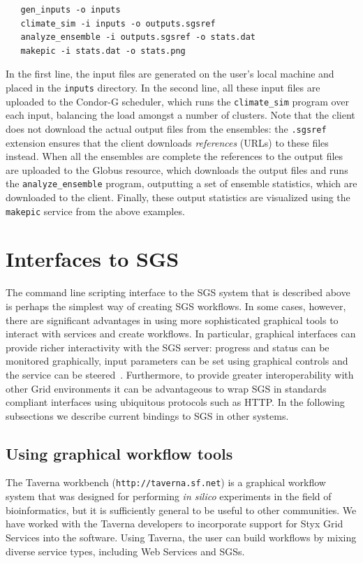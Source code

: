 \documentclass[a4paper]{article}
\begin{document}
\begin{verbatim}
   gen_inputs -o inputs
   climate_sim -i inputs -o outputs.sgsref
   analyze_ensemble -i outputs.sgsref -o stats.dat
   makepic -i stats.dat -o stats.png
\end{verbatim}

In the first line, the input files are generated on the user's local machine and placed in the \texttt{inputs} directory.  In the second line, all these input files are uploaded to the Condor-G scheduler, which runs the \texttt{climate\_sim} program over each input, balancing the load amongst a number of clusters.  Note that the client does not download the actual output files from the ensembles: the \texttt{.sgsref} extension ensures that the client downloads \textit{references} (URLs) to these files instead.  When all the ensembles are complete the references to the output files are uploaded to the Globus resource, which downloads the output files and runs the \texttt{analyze\_ensemble} program, outputting a set of ensemble statistics, which are downloaded to the client.  Finally, these output statistics are visualized using the \texttt{makepic} service from the above examples.

\section{Interfaces to SGS}
The command line scripting interface to the SGS system that is described above is perhaps the simplest way of creating SGS workflows. In some cases, however, there are significant advantages in using more sophisticated graphical tools to interact with services and create workflows.  In particular, graphical interfaces can provide richer interactivity with the SGS server: progress and status can be monitored graphically, input parameters can be set using graphical controls and the service can be steered~\cite{blower:2005}. Furthermore, to provide greater interoperability with other Grid environments it can be advantageous to wrap SGS in standards compliant interfaces using ubiquitous protocols such as HTTP. In the following subsections we describe current bindings to SGS in other systems.

\subsection{Using graphical workflow tools}\label{subsec:graphical-workflow}

The Taverna workbench (\texttt{http://taverna.sf.net}) is a graphical workflow system that was designed for performing {\it in silico} experiments in the field of bioinformatics, but it is sufficiently general to be useful to other communities.  We have worked with the Taverna developers to incorporate support for Styx Grid Services into the software.  Using Taverna, the user can build workflows by mixing diverse service types, including Web Services and SGSs.
\end{document}
